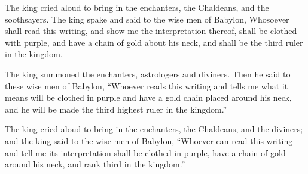 			\begin{versebox}
					\item[BHS] 
					\item[LXX] 
					\item[ASV] The king cried aloud to bring in the enchanters, the Chaldeans, and the soothsayers. The king spake and said to the wise men of Babylon, Whosoever shall read this writing, and show me the interpretation thereof, shall be clothed with purple, and have a chain of gold about his neck, and shall be the third ruler in the kingdom.
					\item[NIV] The king summoned the enchanters, astrologers and diviners. Then he said to these wise men of Babylon, “Whoever reads this writing and tells me what it means will be clothed in purple and have a gold chain placed around his neck, and he will be made the third highest ruler in the kingdom.”
					\item[NRSV] The king cried aloud to bring in the enchanters, the Chaldeans, and the diviners; and the king said to the wise men of Babylon, “Whoever can read this writing and tell me its interpretation shall be clothed in purple, have a chain of gold around his neck, and rank third in the kingdom.”
			\end{versebox}

